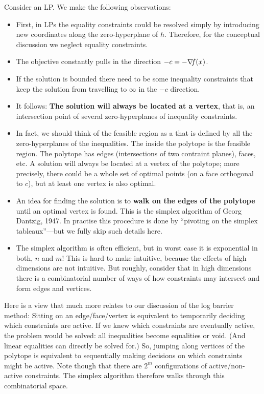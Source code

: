 Consider an LP. We make the following observations:
\begin{itemize}
\item First, in LPs the equality constraints could be resolved simply
by introducing new coordinates along the zero-hyperplane of
$h$. Therefore, for the conceptual discussion we neglect equality constraints.
\item The objective constantly pulls in the direction $-c = -{\nabla_{\!\!}}
f(x)$.
\item If the solution is bounded there need to be some inequality
constraints that keep the solution from travelling to $\infty$ in the
$-c$ direction.
\item It follows: \textbf{The solution will always be located at a vertex},
that is, an intersection point of several zero-hyperplanes of
inequality constraints.
\item In fact, we should think of the feasible region as
a  that is defined by all the zero-hyperplanes of the
inequalities. The inside the polytope is the feasible region. The
polytope has edges (intersections of two contraint planes), faces,
etc. A solution will always be located at a vertex of the polytope;
more precisely, there could be a whole set of optimal points (on a
face orthogonal to $c$), but at least one vertex is also optimal.
\item An idea for finding the solution is to \textbf{walk on the edges
of the polytope} until an optimal vertex is found. This is the simplex
algorithm of Georg Dantzig, 1947. In practise this procedure is done
by ``pivoting on the simplex tableaux''---but we fully skip such
details here.
\item The simplex algorithm is often efficient, but in worst case it is
exponential in both, $n$ and $m$! This is hard to make intuitive,
because the effects of high dimensions are not intuitive. But roughly,
consider that in high dimensions there is a combinatorial number of
ways of how constraints may intersect and form edges and vertices.
\end{itemize}

Here is a view that much more relates to our discussion of the log
barrier method: Sitting on an edge/face/vertex is equivalent to
temporarily deciding which constraints are active. If we knew which
constraints are eventually active, the problem would be solved: all
inequalities become equalities or void. (And linear equalities can
directly be solved for.) So, jumping along vertices of the polytope is
equivalent to sequentially making decisions on which constraints might
be active. Note though that there are $2^m$ configurations of
active/non-active constraints. The simplex algorithm therefore walks
through this combinatorial space.

